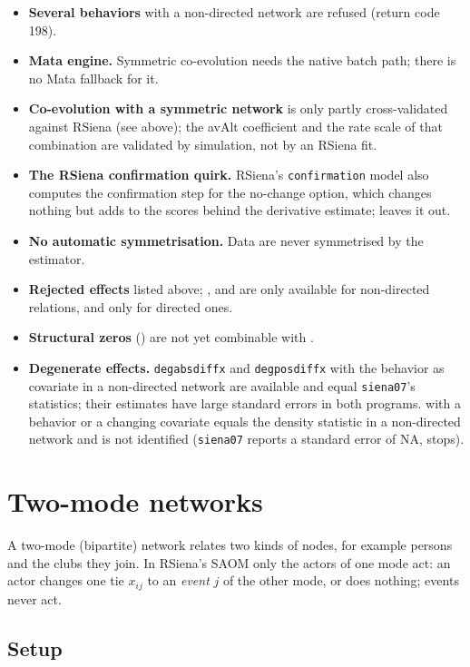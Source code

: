 \begin{itemize}
\item \textbf{Several behaviors} with a non-directed network are refused (return code 198).
\item \textbf{Mata engine.} Symmetric co-evolution needs the native batch path; there is no Mata fallback for it.
\item \textbf{Co-evolution with a symmetric network} is only partly cross-validated against RSiena (see above); the avAlt coefficient and the rate scale of that combination are validated by simulation, not by an RSiena fit.
\item \textbf{The RSiena confirmation quirk.} RSiena's \texttt{confirmation} model also computes the confirmation step for the no-change option, which changes nothing but adds to the scores behind the derivative estimate; \nwsaom{} leaves it out.
\item \textbf{No automatic symmetrisation.} Data are never symmetrised by the estimator.
\item \textbf{Rejected effects} listed above; ,  and  are only available for non-directed relations,  and  only for directed ones.
\item \textbf{Structural zeros} () are not yet combinable with .
\item \textbf{Degenerate effects.} \texttt{degabsdiffx} and \texttt{degposdiffx} with the behavior as covariate in a non-directed network are available and equal \texttt{siena07}'s statistics; their estimates have large standard errors in both programs.  with a behavior or a changing covariate equals the density statistic in a non-directed network and is not identified (\texttt{siena07} reports a standard error of NA, \nwsaom{} stops).
\end{itemize}

\section{Two-mode networks}\label{sec:twomode}

A two-mode (bipartite) network relates two kinds of nodes, for example persons and the clubs they join. In RSiena's SAOM only the actors of one mode act: an actor changes one tie $x_{ij}$ to an \emph{event} $j$ of the other mode, or does nothing; events never act.

\subsection{Setup}

